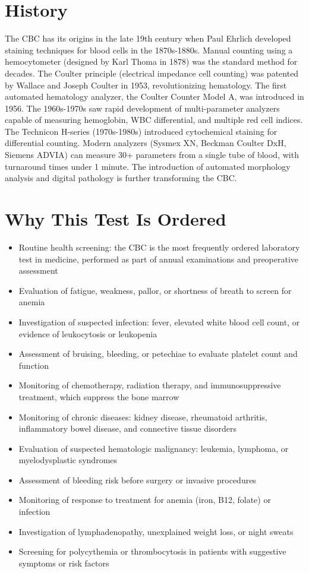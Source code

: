 \section*{History}
The CBC has its origins in the late 19th century when Paul Ehrlich developed staining techniques for blood cells in the 1870s-1880s. Manual counting using a hemocytometer (designed by Karl Thoma in 1878) was the standard method for decades. The Coulter principle (electrical impedance cell counting) was patented by Wallace and Joseph Coulter in 1953, revolutionizing hematology. The first automated hematology analyzer, the Coulter Counter Model A, was introduced in 1956. The 1960s-1970s saw rapid development of multi-parameter analyzers capable of measuring hemoglobin, WBC differential, and multiple red cell indices. The Technicon H-series (1970s-1980s) introduced cytochemical staining for differential counting. Modern analyzers (Sysmex XN, Beckman Coulter DxH, Siemens ADVIA) can measure 30+ parameters from a single tube of blood, with turnaround times under 1 minute. The introduction of automated morphology analysis and digital pathology is further transforming the CBC.

\section*{Why This Test Is Ordered}
\begin{itemize}
  \item Routine health screening: the CBC is the most frequently ordered laboratory test in medicine, performed as part of annual examinations and preoperative assessment
  \item Evaluation of fatigue, weakness, pallor, or shortness of breath to screen for anemia
  \item Investigation of suspected infection: fever, elevated white blood cell count, or evidence of leukocytosis or leukopenia
  \item Assessment of bruising, bleeding, or petechiae to evaluate platelet count and function
  \item Monitoring of chemotherapy, radiation therapy, and immunosuppressive treatment, which suppress the bone marrow
  \item Monitoring of chronic diseases: kidney disease, rheumatoid arthritis, inflammatory bowel disease, and connective tissue disorders
  \item Evaluation of suspected hematologic malignancy: leukemia, lymphoma, or myelodysplastic syndromes
  \item Assessment of bleeding risk before surgery or invasive procedures
  \item Monitoring of response to treatment for anemia (iron, B12, folate) or infection
  \item Investigation of lymphadenopathy, unexplained weight loss, or night sweats
  \item Screening for polycythemia or thrombocytosis in patients with suggestive symptoms or risk factors
\end{itemize}

